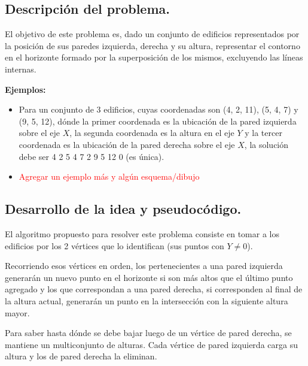 \subsection{Descripción del problema.}

\vspace*{0.3cm}

El objetivo de este problema es, dado un conjunto de edificios representados
por la posición de sus paredes izquierda, derecha y su altura, representar el
contorno en el horizonte formado por la superposición de los mismos, excluyendo
las líneas internas. 

\vspace*{0.5cm}

\textbf{Ejemplos:}
\begin{itemize}
  \item Para un conjunto de 3 edificios, cuyas coordenadas son (4, 2, 11),
  (5, 4, 7) y (9, 5, 12), dónde la primer coordenada es la ubicación de la pared
  izquierda sobre el eje $X$, la segunda coordenada es la altura en el eje $Y$ y la
  tercer coordenada es la ubicación de la pared derecha sobre el eje $X$, la
  solución debe ser 4 2 5 4 7 2 9 5 12 0 (es única).
  
  \item \textcolor{red}{Agregar un ejemplo más y algún esquema/dibujo}
\end{itemize}



\subsection{Desarrollo de la idea y pseudocódigo.}

\vspace*{0.3cm}

El algoritmo propuesto para resolver este problema consiste en tomar a los edificios 
por los 2 vértices que lo identifican (sus puntos con $Y \neq 0$).

Recorriendo esos vértices en orden, los pertenecientes a una pared izquierda
generarán un nuevo punto en el horizonte si son más altos que el último punto agregado 
y los que correspondan a una pared derecha, si corresponden al final de la
altura actual, generarán un punto en la intersección con la siguiente altura mayor.

Para saber hasta dónde se debe bajar luego de un vértice de pared derecha, se
mantiene un multiconjunto de alturas. Cada vértice de pared izquierda carga su
altura y los de pared derecha la eliminan.

